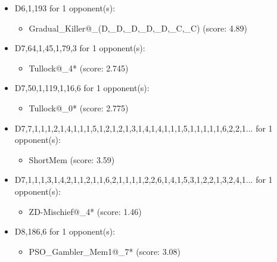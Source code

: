 \begin{appendices}
\begin{itemize}
    \item D6,1,193 for 1 opponent(s):
    \begin{multicols}{3}
         \begin{itemize}
            \item Gradual\_Killer@\_(D,\_D,\_D,\_D,\_D,\_C,\_C) (score: 4.89)
        \end{itemize}
     \end{multicols}
     
    \item D7,64,1,45,1,79,3 for 1 opponent(s):
    \begin{multicols}{3}
         \begin{itemize}
            \item Tullock@\_4* (score: 2.745)
        \end{itemize}
     \end{multicols}
     
    \item D7,50,1,119,1,16,6 for 1 opponent(s):
    \begin{multicols}{3}
         \begin{itemize}
            \item Tullock@\_0* (score: 2.775)
        \end{itemize}
     \end{multicols}
     
    \item D7,7,1,1,1,2,1,4,1,1,1,5,1,2,1,2,1,3,1,4,1,4,1,1,1,5,1,1,1,1,1,6,2,2,1... for 1 opponent(s):
    \begin{multicols}{3}
         \begin{itemize}
            \item ShortMem (score: 3.59)
        \end{itemize}
     \end{multicols}
     
    \item D7,1,1,1,3,1,4,2,1,1,2,1,1,6,2,1,1,1,1,2,2,6,1,4,1,5,3,1,2,2,1,3,2,4,1... for 1 opponent(s):
    \begin{multicols}{3}
         \begin{itemize}
            \item ZD-Mischief@\_4* (score: 1.46)
        \end{itemize}
     \end{multicols}
     
    \item D8,186,6 for 1 opponent(s):
    \begin{multicols}{3}
         \begin{itemize}
            \item PSO\_Gambler\_Mem1@\_7* (score: 3.08)
        \end{itemize}
     \end{multicols}
     

\end{itemize}
\end{appendices}
